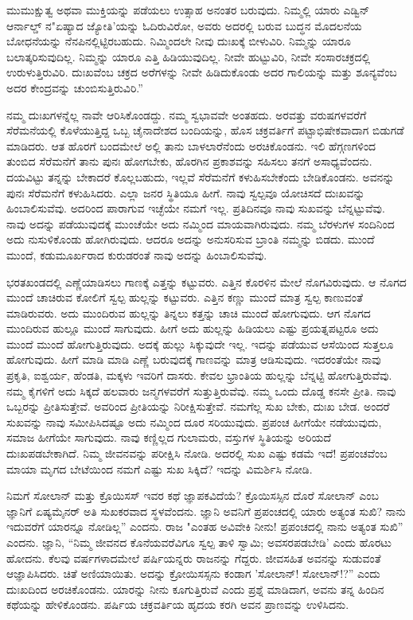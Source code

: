ಮುಮುಕ್ಷುತ್ವ ಅಥವಾ ಮುಕ್ತಿಯನ್ನು ಪಡೆಯಲು ಉತ್ಸಾಹ ಅನಂತರ ಬರುವುದು. ನಿಮ್ಮಲ್ಲಿ ಯಾರು ಎಡ್ವಿನ್ ಆರ್ನಾಲ್ಡ್ ನ"ಏಷ್ಯಾದ ಜ್ಯೋತಿ'ಯನ್ನು ಓದಿರುವಿರೋ, ಅವರು ಅದರಲ್ಲಿ ಬರುವ ಬುದ್ಧನ ಮೊದಲನೆಯ ಬೋಧನೆಯನ್ನು ನೆನಪಿನಲ್ಲಿಟ್ಟಿರಬಹುದು. ನಿಮ್ಮಿಂದಲೇ ನೀವು ದುಃಖಕ್ಕೆ ಬೀಳುವಿರಿ. ನಿಮ್ಮನ್ನು ಯಾರೂ ಬಲಾತ್ಕರಿಸುವುದಿಲ್ಲ. ನಿಮ್ಮನ್ನು ಯಾರೂ ಎತ್ತಿ ಹಿಡಿಯುವುದಿಲ್ಲ. ನೀವೇ ಹುಟ್ಟುವಿರಿ, ನೀವೇ ಸಂಸಾರಚಕ್ರದಲ್ಲಿ ಉರುಳುತ್ತಿರುವಿರಿ. ದುಃಖವೆಂಬ ಚಕ್ರದ ಅರೆಗಳನ್ನು ನೀವೇ ಹಿಡಿದುಕೊಂಡು ಅದರ ಗಾಲಿಯನ್ನು ಮತ್ತು ಶೂನ್ಯವೆಂಬ ಅದರ ಕೇಂದ್ರವನ್ನು ಚುಂಬಿಸುತ್ತಿರುವಿರಿ.”

ನಮ್ಮ ದುಃಖಗಳನ್ನೆಲ್ಲ ನಾವೇ ಆರಿಸಿಕೊಂಡದ್ದು. ನಮ್ಮ ಸ್ವಭಾವವೇ ಅಂತಹದು. ಅರವತ್ತು ವರುಷಗಳವರೆಗೆ ಸೆರೆಮನೆಯಲ್ಲಿ ಕೊಳೆಯುತ್ತಿದ್ದ ಒಬ್ಬ ಚೈನಾದೇಶದ ಬಂದಿಯನ್ನು, ಹೊಸ ಚಕ್ರವರ್ತಿಗೆ ಪಟ್ಟಾಭಿಷೇಕವಾದಾಗ ಬಿಡುಗಡೆ ಮಾಡಿದರು. ಆತ ಹೊರಗೆ ಬಂದಮೇಲೆ ಅಲ್ಲಿ ತಾನು ಬಾಳಲಾರೆನೆಂದು ಅರಚಿಕೊಂಡನು. ಇಲಿ ಹೆಗ್ಗಣಗಳಿಂದ ತುಂಬಿದ ಸೆರೆಮನೆಗೆ ತಾನು ಪುನಃ ಹೋಗಬೇಕು, ಹೊರಗಿನ ಪ್ರಕಾಶವನ್ನು ಸಹಿಸಲು ತನಗೆ ಅಸಾಧ್ಯವೆಂದನು. ದಯವಿಟ್ಟು ತನ್ನನ್ನು ಬೇಕಾದರೆ ಕೊಲ್ಲಬಹುದು, ಇಲ್ಲವೆ ಸೆರೆಮನೆಗೆ ಕಳುಹಿಸಬೇಕೆಂದು ಬೇಡಿಕೊಂಡನು. ಅವನನ್ನು ಪುನಃ ಸೆರೆಮನೆಗೆ ಕಳುಹಿಸಿದರು. ಎಲ್ಲಾ ಜನರ ಸ್ಥಿತಿಯೂ ಹೀಗೆ. ನಾವು ಸ್ವಲ್ಪವೂ ಯೋಚಿಸದೆ ದುಃಖವನ್ನು ಹಿಂಬಾಲಿಸುವೆವು. ಅದರಿಂದ ಪಾರಾಗುವ ಇಚ್ಛೆಯೇ ನಮಗೆ ಇಲ್ಲ. ಪ್ರತಿದಿನವೂ ನಾವು ಸುಖವನ್ನು ಬೆನ್ನಟ್ಟುವೆವು. ನಾವು ಅದನ್ನು ಪಡೆಯುವುದಕ್ಕೆ ಮುಂಚೆಯೇ ಅದು ನಮ್ಮಿಂದ ಮಾಯವಾಗಿರುವುದು. ನಮ್ಮ ಬೆರಳುಗಳ ಸಂದಿನಿಂದ ಅದು ನುಸುಳಿಕೊಂಡು ಹೋಗಿರುವುದು. ಆದರೂ ಅದನ್ನು ಅನುಸರಿಸುವ ಬ್ರಾಂತಿ ನಮ್ಮನ್ನು ಬಿಡದು. ಮುಂದೆ ಮುಂದೆ, ಕಡುಮೂರ್ಖರಾದ ಕುರುಡರಂತೆ ನಾವು ಅದನ್ನು ಹಿಂಬಾಲಿಸುವೆವು.

ಭರತಖಂಡದಲ್ಲಿ ಎಣ್ಣೆಯಾಡಿಸಲು ಗಾಣಕ್ಕೆ ಎತ್ತನ್ನು ಕಟ್ಟುವರು. ಎತ್ತಿನ ಕೊರಳಿನ ಮೇಲೆ ನೊಗವಿರುವುದು. ಆ ನೊಗದ ಮುಂದೆ ಚಾಚಿರುವ ಕೋಲಿಗೆ ಸ್ವಲ್ಪ ಹುಲ್ಲನ್ನು ಕಟ್ಟುವರು. ಎತ್ತಿನ ಕಣ್ಣು ಮುಂದೆ ಮಾತ್ರ ಸ್ವಲ್ಪ ಕಾಣುವಂತೆ ಮಾಡಿರುವರು. ಅದು ಮುಂದಿರುವ ಹುಲ್ಲನ್ನು ತಿನ್ನಲು ಕತ್ತನ್ನು ಚಾಚಿ ಮುಂದೆ ಹೋಗುವುದು. ಆಗ ನೊಗದ ಮುಂದಿರುವ ಹುಲ್ಲೂ ಮುಂದೆ ಸಾಗುವುದು. ಹೀಗೆ ಅದು ಹುಲ್ಲನ್ನು ಹಿಡಿಯಲು ಎಷ್ಟು ಪ್ರಯತ್ನಪಟ್ಟರೂ ಅದು ಮುಂದೆ ಮುಂದೆ ಹೋಗುತ್ತಿರುವುದು. ಅದಕ್ಕೆ ಹುಲ್ಲು ಸಿಕ್ಕುವುದೇ ಇಲ್ಲ. ಇದನ್ನು ಪಡೆಯುವ ಆಸೆಯಿಂದ ಸುತ್ತಲೂ ಹೋಗುವುದು. ಹೀಗೆ ಮಾಡಿ ಮಾಡಿ ಎಣ್ಣೆ ಬರುವುದಕ್ಕೆ ಗಾಣವನ್ನು ಮಾತ್ರ ಆಡಿಸುವುದು. ಇದರಂತೆಯೇ ನಾವು ಪ್ರಕೃತಿ, ಐಶ್ವರ್ಯ, ಹೆಂಡತಿ, ಮಕ್ಕಳು ಇವರಿಗೆ ದಾಸರು. ಕೇವಲ ಭ್ರಾಂತಿಯ ಹುಲ್ಲನ್ನು ಬೆನ್ನಟ್ಟಿ ಹೋಗುತ್ತಿರುವೆವು. ನಮ್ಮ ಕೈಗಳಿಗೆ ಅದು ಸಿಕ್ಕದೆ ಹಲವಾರು ಜನ್ಮಗಳವರೆಗೆ ಸುತ್ತುತ್ತಿರುವೆವು. ನಮ್ಮ ಒಂದು ದೊಡ್ಡ ಕನಸೇ ಪ್ರೀತಿ. ನಾವು ಒಬ್ಬರನ್ನು ಪ್ರೀತಿಸುತ್ತೇವೆ. ಅವರಿಂದ ಪ್ರೀತಿಯನ್ನು ನಿರೀಕ್ಷಿಸುತ್ತೇವೆ. ನಮಗೆಲ್ಲ ಸುಖ ಬೇಕು, ದುಃಖ ಬೇಡ. ಅಂದರೆ ಸುಖವನ್ನು ನಾವು ಸಮೀಪಿಸಿದಷ್ಟೂ ಅದು ನಮ್ಮಿಂದ ದೂರ ಸರಿಯುವುದು. ಪ್ರಪಂಚ ಹೀಗೆಯೇ ನಡೆಯುವುದು, ಸಮಾಜ ಹೀಗೆಯೇ ಸಾಗುವುದು. ನಾವು ಕಣ್ಣಿಲ್ಲದ ಗುಲಾಮರು, ವಸ್ತುಗಳ ಸ್ಥಿತಿಯನ್ನು ಅರಿಯದೆ ದುಃಖಪಡಬೇಕಾಗಿದೆ. ನಿಮ್ಮ ಜೀವನವನ್ನು ಪರೀಕ್ಷಿಸಿ ನೋಡಿ. ಅದರಲ್ಲಿ ಸುಖ ಎಷ್ಟು ಕಡಮೆ ಇದೆ! ಪ್ರಪಂಚವೆಂಬ ಮಾಯಾ ಮೃಗದ ಬೇಟೆಯಿಂದ ನಮಗೆ ಎಷ್ಟು ಸುಖ ಸಿಕ್ಕಿದೆ? ಇದನ್ನು ವಿಮರ್ಶಿಸಿ ನೋಡಿ.

ನಿಮಗೆ ಸೋಲಾನ್ ಮತ್ತು ಕ್ರೊಯಿಸಸ್ ಇವರ ಕಥೆ ಜ್ಞಾಪಕವಿದೆಯೆ? ಕ್ರೊಯಿಸಸ್ಸಿನ ದೊರೆ ಸೋಲಾನ್ ಎಂಬ ಜ್ಞಾನಿಗೆ ಏಷ್ಯಮೈನರ್ ಅತಿ ಸುಖಕರವಾದ ಸ್ಥಳವೆಂದನು. ಜ್ಞಾನಿ ಅವನಿಗೆ ಪ್ರಪಂಚದಲ್ಲಿ ಯಾರು ಅತ್ಯಂತ ಸುಖಿ? ನಾನು ಇದುವರೆಗೆ ಯಾರನ್ನೂ ನೋಡಿಲ್ಲ” ಎಂದನು. ರಾಜ "ಎಂತಹ ಅವಿವೇಕಿ ನೀನು! ಪ್ರಪಂಚದಲ್ಲಿ ನಾನು ಅತ್ಯಂತ ಸುಖಿ'' ಎಂದನು. ಜ್ಞಾನಿ, “ನಿಮ್ಮ ಜೀವನದ ಕೊನೆಯವರೆವಿಗೂ ಸ್ವಲ್ಪ ತಾಳಿ ಸ್ವಾಮಿ; ಅವಸರಪಡಬೇಡಿ' ಎಂದು ಹೊರಟು ಹೋದನು. ಕೆಲವು ವರ್ಷಗಳಾದಮೇಲೆ ಪರ್ಷಿಯನ್ನರು ರಾಜನನ್ನು ಗೆದ್ದರು. ಜೀವಸಹಿತ ಅವನನ್ನು ಸುಡುವಂತೆ ಆಜ್ಞಾಪಿಸಿದರು. ಚಿತೆ ಅಣಿಯಾಯಿತು. ಅದನ್ನು ಕ್ರೋಯಿಸಸ್ಸನು ಕಂಡಾಗ 'ಸೋಲಾನ್! ಸೋಲಾನ್!?” ಎಂದು ದುಃಖದಿಂದ ಅರಚಿಕೊಂಡನು. ಯಾರನ್ನು ನೀನು ಕೂಗುತ್ತಿರುವೆ ಎಂದು ಪ್ರಶ್ನೆ ಮಾಡಿದಾಗ, ಅವನು ತನ್ನ ಹಿಂದಿನ ಕಥೆಯನ್ನು ಹೇಳಿಕೊಂಡನು. ಪರ್ಷಿಯ ಚಕ್ರವರ್ತಿಯ ಹೃದಯ ಕರಗಿ ಅವನ ಪ್ರಾಣವನ್ನು ಉಳಿಸಿದನು.

